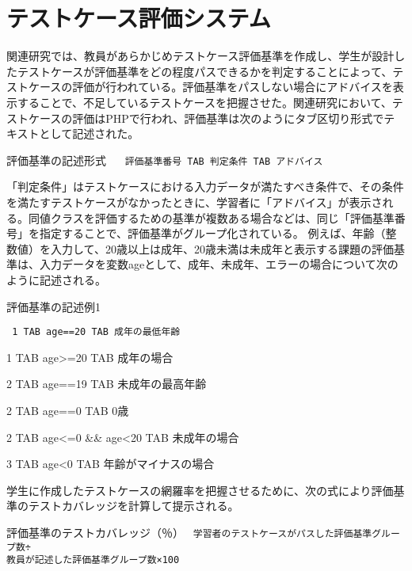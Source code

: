 \documentclass{tpu-sotu}
\begin{document}
\section{テストケース評価システム}
関連研究では、教員があらかじめテストケース評価基準を作成し、学生が設計したテストケースが評価基準をどの程度パスできるかを判定することによって、テストケースの評価が行われている。評価基準をパスしない場合にアドバイスを表示することで、不足しているテストケースを把握させた。関連研究において、テストケースの評価はPHPで行われ、評価基準は次のようにタブ区切り形式でテキストとして記述された。

\begin{minipage}[b]{.7\textwidth}
\begin{itembox}[l]{評価基準の記述形式}
{\tt
　評価基準番号 TAB 判定条件 TAB アドバイス
}
\end{itembox}
\end{minipage}

「判定条件」はテストケースにおける入力データが満たすべき条件で、その条件を満たすテストケースがなかったときに、学習者に「アドバイス」が表示される。同値クラスを評価するための基準が複数ある場合などは、同じ「評価基準番号」を指定することで、評価基準がグループ化されている。
例えば、年齢（整数値）を入力して、20歳以上は成年、20歳未満は未成年と表示する課題の評価基準は、入力データを変数ageとして、成年、未成年、エラーの場合について次のように記述される。

\begin{minipage}[b]{.7\textwidth}
\begin{itembox}[l]{評価基準の記述例1}
{\tt
1 TAB age==20 TAB 成年の最低年齢

1 TAB age>=20 TAB 成年の場合

2 TAB age==19 TAB 未成年の最高年齢

2 TAB age==0 TAB 0歳

2 TAB age<=0 \&\& age<20 TAB 未成年の場合

3 TAB age<0 TAB 年齢がマイナスの場合
}
\end{itembox}
\end{minipage}

学生に作成したテストケースの網羅率を把握させるために、次の式により評価基準のテストカバレッジを計算して提示される。

\begin{minipage}[b]{.7\textwidth}
\begin{itembox}[l]{評価基準のテストカバレッジ（％）}
{\tt
学習者のテストケースがパスした評価基準グループ数÷\\教員が記述した評価基準グループ数×100
}
\end{itembox}
\end{minipage}
\end{document}
